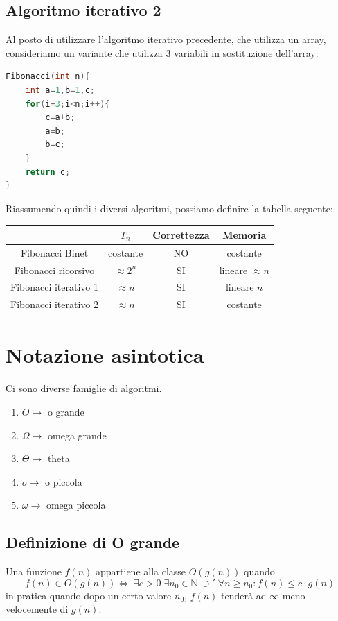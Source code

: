 \documentclass[italian]{article}
\newcommand{\ins}[1]{\text{$\mathbb{#1}$}}
\newcommand{\taleche}{\;\ni'\;}
\newcommand{\omicron}{o}
\newcommand{\varOmicron}{O}
\newcommand{\varOmicronClass}{\varOmicron(g(n))}
\newcommand{\fn}{f(n)}
\newcommand{\gn}{g(n)}
\let\oldexists\exists
\renewcommand{\exists}{\text{$\;\oldexists$}}
\begin{document}
\subsection{Algoritmo iterativo 2}
Al posto di utilizzare l'algoritmo iterativo precedente, che utilizza un array, consideriamo un variante che utilizza 3 variabili in sostituzione dell'array:
\begin{lstlisting}[language=c]
Fibonacci(int n){
	int a=1,b=1,c;
	for(i=3;i<n;i++){
		c=a+b;
		a=b;
		b=c;
	}
	return c;
}
\end{lstlisting}
Riassumendo quindi i diversi algoritmi, possiamo definire la tabella seguente:
\begin{table}[h]
	\centering
	\begin{tabular}{|c|c|c|c|}
		\hline
		& \textbf{$T_n$} & \textbf{Correttezza} & \textbf{Memoria}    \\ \hline
		Fibonacci Binet       & costante       & NO                   & costante            \\ \hline
		Fibonacci ricorsivo   & $\approx 2^n$  & SI                   & lineare $\approx n$ \\ \hline
		Fibonacci iterativo 1 & $\approx n$    & SI                   & lineare $n$         \\ \hline
		Fibonacci iterativo 2 & $\approx n$    & SI                   & costante            \\ \hline
	\end{tabular}
\end{table}
\pagebreak
\section{Notazione asintotica}
Ci sono diverse famiglie di algoritmi.
\begin{enumerate}[itemsep=0mm]
	\item $\varOmicron \to $  o grande
	\item $\varOmega \to$ omega grande
	\item $\varTheta \to$ theta
	\item $\omicron \to$ o piccola
	\item $\omega \to$ omega piccola
\end{enumerate}
\subsection{Definizione di O grande}
Una funzione $f(n)$ appartiene alla classe $\varOmicronClass$ quando
\[
	f(n) \in \varOmicron\left(g(n)\right) \iff \exists c>0 \exists n_0 \in \ins{N} \taleche \forall n \geq n_0 : f(n) \leq c\cdot g(n)
\]
in pratica quando dopo un certo valore $n_0$, $\fn$ tenderà ad $\infty$ meno velocemente di $\gn$.
\end{document}
